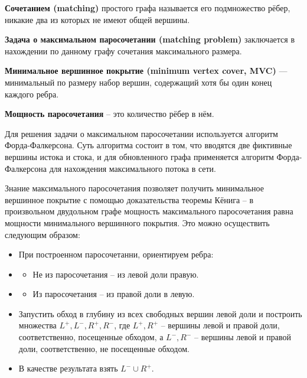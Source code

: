 \documentclass[11pt]{article}
\providecommand{\tightlist}{%
      \setlength{\itemsep}{0pt}\setlength{\parskip}{0pt}}
\begin{document}
    \textbf{Сочетанием (matching)} простого графа называется его
подмножество рёбер, никакие два из которых не имеют общей вершины.

\textbf{Задача о максимальном паросочетании (matching problem)}
заключается в нахождении по данному графу сочетания максимального
размера.

\textbf{Минимальное вершинное покрытие (minimum vertex cover, MVC)} ---
минимальный по размеру набор вершин, содержащий хотя бы один конец
каждого ребра.

\textbf{Мощность паросочетания} -- это количество рёбер в нём.

    Для решения задачи о максимальном паросочетании используется алгоритм
Форда-Фалкерсона. Суть алгоритма состоит в том, что вводятся две
фиктивные вершины истока и стока, и для обновленного графа применяется
алгоритм Форда-Фалкерсона для нахождения максимального потока в сети.

Знание максимального паросочетания позволяет получить минимальное
вершинное покрытие с помощью доказательства теоремы Кёнига -- в
произвольном двудольном графе мощность максимального паросочетания равна
мощности минимального вершинного покрытия. Это можно осуществить
следующим образом:

\begin{itemize}
\item
  При построенном паросочетанни, ориентируем ребра:
\item
  \begin{itemize}
  \tightlist
  \item
    Не из паросочетания -- из левой доли правую.
  \end{itemize}
\item
  \begin{itemize}
  \tightlist
  \item
    Из паросочетания -- из правой доли в левую.
  \end{itemize}
\item
  Запустить обход в глубину из всех свободных вершин левой доли и
  построить множества \(L^+,L^-,R^+,R^-\), где \(L^+,R^+\) -- вершины
  левой и правой доли, соответственно, посещенные обходом, а \(L^-,R^-\)
  -- вершины левой и правой доли, соответственно, не посещенные обходом.
\item
  В качестве результата взять \(L^-\cup R^+\).
\end{itemize}
\end{document}
